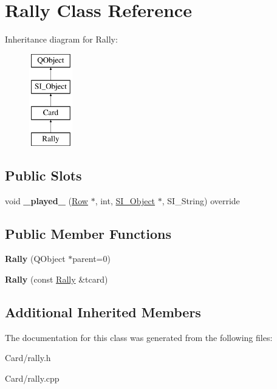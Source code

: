 \hypertarget{class_rally}{}\section{Rally Class Reference}
\label{class_rally}
Inheritance diagram for Rally\+:\begin{figure}[H]
\begin{center}
\leavevmode
\includegraphics[height=4.000000cm]{class_rally}
\end{center}
\end{figure}
\subsection*{Public Slots}
\begin{DoxyCompactItemize}
\item 
\mbox{\label{class_rally_a984380ef0c7d08c8afdf5732346cf1fe}} 
void {\bfseries \+\_\+played\+\_\+} (\hyperlink{class_card_set}{Row} $\ast$, int, \hyperlink{class_s_i___object}{S\+I\+\_\+\+Object} $\ast$, S\+I\+\_\+\+String) override
\end{DoxyCompactItemize}
\subsection*{Public Member Functions}
\begin{DoxyCompactItemize}
\item 
\mbox{\label{class_rally_a5ed9d349ce6ab27d7fd88ba780ec19bd}} 
{\bfseries Rally} (Q\+Object $\ast$parent=0)
\item 
\mbox{\label{class_rally_a2cbf8a5dfea48485b39c63976668432c}} 
{\bfseries Rally} (const \hyperlink{class_rally}{Rally} \&tcard)
\end{DoxyCompactItemize}
\subsection*{Additional Inherited Members}


The documentation for this class was generated from the following files\+:\begin{DoxyCompactItemize}
\item 
Card/rally.\+h\item 
Card/rally.\+cpp\end{DoxyCompactItemize}
